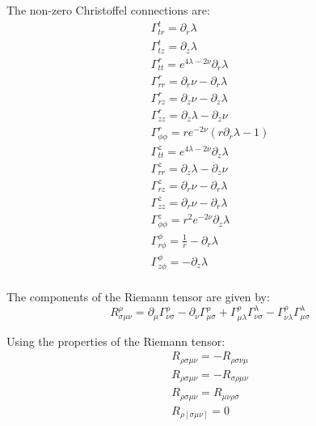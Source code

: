 \documentclass{article}
\begin{document}
The non-zero Christoffel connections are:
\begin{equation}
\begin{array}{l}
\Gamma^{t}_{tr}=\partial_{r}\lambda\\
\Gamma^{t}_{tz}=\partial_{z}\lambda\\
\Gamma^{r}_{tt}=e^{4\lambda-2\nu}\partial_{r}\lambda\\
\Gamma^{r}_{rr}=\partial_{r}\nu-\partial_{r}\lambda\\
\Gamma^{r}_{rz}=\partial_{z}\nu-\partial_{z}\lambda\\
\Gamma^{r}_{zz}=\partial_{z}\lambda-\partial_{z}\nu\\
\Gamma^{r}_{\phi\phi}=re^{-2\nu}\left(r\partial_{r}\lambda-1\right)\\
\Gamma^{z}_{tt}=e^{4\lambda-2\nu}\partial_{z}\lambda\\
\Gamma^{z}_{rr}=\partial_{z}\lambda-\partial_{z}\nu\\
\Gamma^{z}_{rz}=\partial_{r}\nu-\partial_{r}\lambda\\ 
\Gamma^{z}_{zz}=\partial_{r}\nu-\partial_{r}\lambda\\
\Gamma^{z}_{\phi\phi}=r^{2}e^{-2\nu}\partial_{z}\lambda\\
\Gamma^{\phi}_{r\phi}=\frac{1}{r}-\partial_{r}\lambda\\
\Gamma^{\phi}_{z\phi}=-\partial_{z}\lambda\\
\end{array}\label{eq:christoffel-connections}
\end{equation}

The components of the Riemann tensor are given by:
\begin{equation}
R_{\sigma\mu\nu}^{\rho}=\partial_{\mu}\Gamma_{\nu\sigma}^{\rho}-\partial_{\nu}\Gamma_{\mu\sigma}^{\rho}+\Gamma_{\mu\lambda}^{\rho}\Gamma_{\nu\sigma}^{\lambda}-\Gamma_{\nu\lambda}^{\rho}\Gamma_{\mu\sigma}^{\lambda}
\end{equation}

Using the properties of the Riemann tensor:
\begin{equation}
\begin{array}{l}
R_{\rho\sigma\mu\nu}=-R_{\rho\sigma\nu\mu}\\
R_{\rho\sigma\mu\nu}=-R_{\sigma\rho\mu\nu}\\
R_{\rho\sigma\mu\nu}=R_{\mu\nu\rho\sigma}\\
R_{\rho[\sigma\mu\nu]}=0\\
\end{array}
\end{equation}
\end{document}
